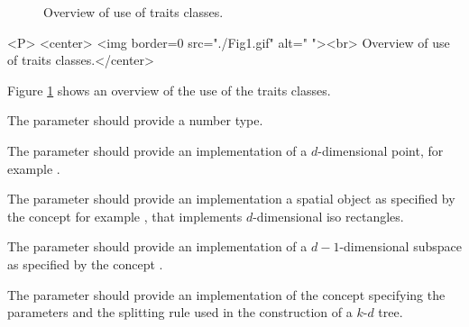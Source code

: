 \begin{figure}[t]
\begin{ccTexOnly}
\begin{center}
\leavevmode
\vspace*{6cm}
\hspace*{-2cm}
\end{center}
\vspace*{-8cm}
\end{ccTexOnly}
\caption{Overview of use of traits classes.
\label{ASPAS:Fig1}}
\end{figure}

\begin{ccHtmlOnly}
<P>
<center>
<img border=0 src="./Fig1.gif" alt=" "><br> 
Overview of use of traits classes.</center>
\end{ccHtmlOnly}




Figure \ref{ASPAS:Fig1} shows an overview of the use of the traits classes.

The parameter  should provide a number type.

The parameter  should provide an implementation of a $d$-dimensional point, 
for example .

The parameter  should provide an implementation a spatial object
as specified by the concept 
for example , that implements $d$-dimensional iso rectangles.

The parameter  should provide an implementation of a $d-1$-dimensional
subspace as specified by the concept .

The parameter  should provide an implementation of the concept 
specifying the parameters and the splitting rule used in the construction of a $k$-$d$ tree.

